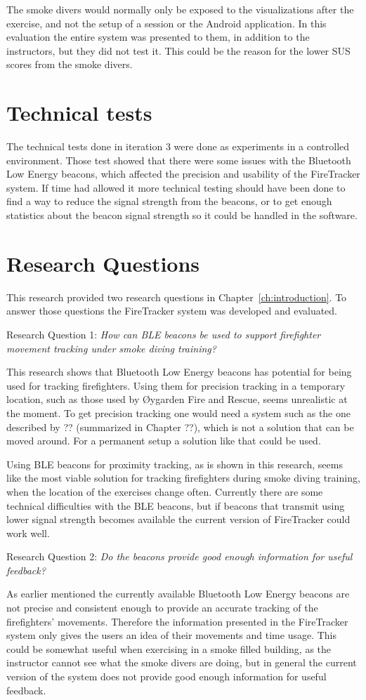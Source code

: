\documentclass[../Main/thesis.tex]{subfiles}
\begin{document}
The smoke divers would normally only be exposed to the visualizations after the exercise, and not the setup of a session or the Android application.
In this evaluation the entire system was presented to them, in addition to the instructors, but they did not test it.
This could be the reason for the lower SUS scores from the smoke divers.

\section{Technical tests}
The technical tests done in iteration 3 were done as experiments in a controlled environment.
Those test showed that there were some issues with the Bluetooth Low Energy beacons, which affected the precision and usability of the FireTracker system.
If time had allowed it more technical testing should have been done to find a way to reduce the signal strength from the beacons, or to get enough statistics about the beacon signal strength so it could be handled in the software.

\section{Research Questions}
This research provided two research questions in Chapter~\ref{ch:introduction}.
To answer those questions the FireTracker system was developed and evaluated.

Research Question 1: \textit{How can BLE beacons be used to support firefighter movement tracking under smoke diving training?}

This research shows that Bluetooth Low Energy beacons has potential for being used for tracking firefighters.
Using them for precision tracking in a temporary location, such as those used by Øygarden Fire and Rescue, seems unrealistic at the moment.
To get precision tracking one would need a system such as the one described by ?? (summarized in Chapter ??), which is not a solution that can be moved around.
For a permanent setup a solution like that could be used.

Using BLE beacons for proximity tracking, as is shown in this research, seems like the most viable solution for tracking firefighters during smoke diving training, when the location of the exercises change often.
Currently there are some technical difficulties with the BLE beacons, but if beacons that transmit using lower signal strength becomes available the current version of FireTracker could work well.

Research Question 2: \textit{Do the beacons provide good enough information for useful feedback?}

As earlier mentioned the currently available Bluetooth Low Energy beacons are not precise and consistent enough to provide an accurate tracking of the firefighters' movements.
Therefore the information presented in the FireTracker system only gives the users an idea of their movements and time usage.
This could be somewhat useful when exercising in a smoke filled building, as the instructor cannot see what the smoke divers are doing, but in general the current version of the system does not provide good enough information for useful feedback.
\end{document}
